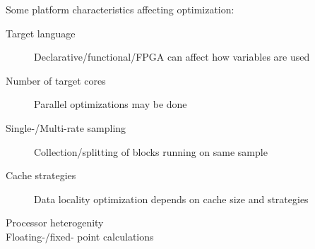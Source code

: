 Some platform characteristics affecting optimization:
\begin{description}
\item[Target language] Declarative/functional/FPGA can affect how variables are used
\item[Number of target cores] Parallel optimizations may be done
\item[Single-/Multi-rate sampling] Collection/splitting of blocks running on same sample
\item[Cache strategies] Data locality optimization depends on cache size and strategies
\item[Processor heterogenity] 
\item[Floating-/fixed- point calculations] 

\end{description}







